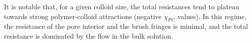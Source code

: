 \documentclass[12pt, a4paper]{article}
\begin{document}

It is notable that, for a given colloid size, the total resistances tend to plateau towards strong polymer-colloid attractions (negative $\chi_{\text{PC}}$ values).
In this regime, the resistance of the pore interior and the brush fringes is minimal, and the total resistance is dominated by the flow in the bulk solution.
\end{document}
